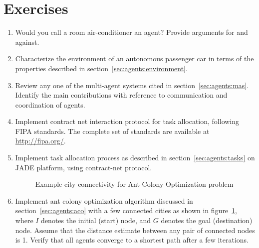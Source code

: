 \section*{Exercises}

\begin{enumerate}
	\item Would you call a room air-conditioner an agent? Provide arguments for and against.
	\item Characterize the environment of an autonomous passenger car in terms of the properties described in 
		section~\ref{sec:agents:environment}.
	\item Review any one of the multi-agent systems cited in section~\ref{sec:agents:mas}. Identify the main
		contributions with reference to communication and coordination of agents.
	\item Implement contract net interaction protocol for task allocation, following FIPA standards. The complete
		set of standards are available at \url{http://fipa.org/}. 
	\item Implement task allocation process as described in section~\ref{sec:agents:tasks} on JADE platform, using
		contract-net protocol.
		\begin{figure} [!htpb]
			\centering
			\caption{Example city connectivity for Ant Colony Optimization problem}
			\label{fig:agents:ant-exercise}
		\end{figure}
	\item Implement ant colony optimization algorithm discussed in section~\ref{sec:agents:aco} with a few connected
		cities as shown in figure~\ref{fig:agents:ant-exercise}, where $I$ denotes the initial (start) node, and
		$G$ denotes the goal (destination) node. Assume that the distance estimate between any 
		pair of connected nodes is 1. Verify that all agents converge to a shortest path after a few iterations. 

\end{enumerate}
